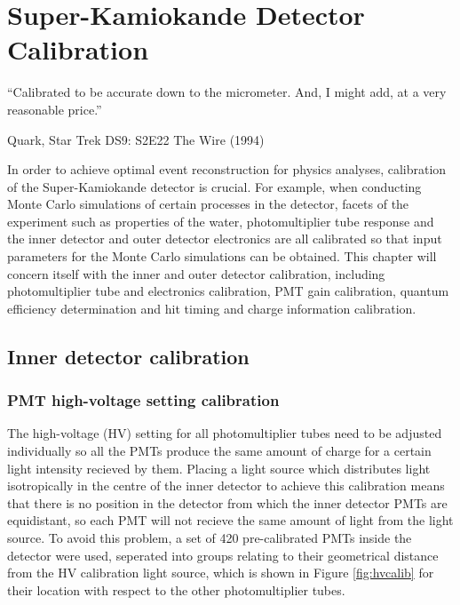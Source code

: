 \chapter{Super-Kamiokande Detector Calibration}
\epigraph{``Calibrated to be accurate down to the micrometer. And, I might add, at a very reasonable price.''}{Quark, Star Trek DS9: S2E22 The Wire (1994)}
\label{chp:superkcalib}

In order to achieve optimal event reconstruction for physics analyses, calibration of the Super-Kamiokande detector is crucial. For example, when conducting Monte Carlo simulations of certain processes in the detector, facets of the experiment such as properties of the water, photomultiplier tube response and the inner detector and outer detector electronics are all calibrated so that input parameters for the Monte Carlo simulations can be obtained. This chapter will concern itself with the inner and outer detector calibration, including photomultiplier tube and electronics calibration, PMT gain calibration, quantum efficiency determination and hit timing and charge information calibration. 

\section{Inner detector calibration}

\subsection{PMT high-voltage setting calibration}

The high-voltage (HV) setting for all photomultiplier tubes need to be adjusted individually so all the PMTs produce the same amount of charge for a certain light intensity recieved by them. Placing a light source which distributes light isotropically in the centre of the inner detector to achieve this calibration means that there is no position in the detector from which the inner detector PMTs are equidistant, so each PMT will not recieve the same amount of light from the light source. To avoid this problem, a set of 420 pre-calibrated PMTs inside the detector were used, seperated into groups relating to their geometrical distance from the HV calibration light source, which is shown in Figure \ref{fig:hvcalib} for their location with respect to the other photomultiplier tubes.

